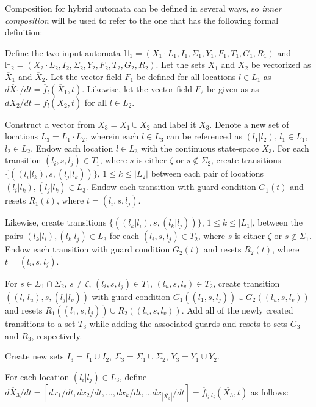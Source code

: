 Composition for hybrid automata can be defined in several ways, so \textit{inner composition} will be used to refer to the one that has the following formal definition:

Define the two input automata $\mathbb{H}_1 = (X_1 \cdot L_1, I_1, \Sigma_1, Y_1, F_1, T_1, G_1, R_1)$ and $\mathbb{H}_2 = (X_2 \cdot L_2, I_2, \Sigma_2, Y_2, F_2, T_2, G_2, R_2)$. Let the sets $X_1$ and $X_2$ be vectorized as $\overline{X}_1$ and $\overline{X}_2$. Let the vector field $F_1$ be defined for all locations $l \in L_1$ as $d\overline{X}_1 / dt = \overline{f}_{l}(\overline{X}_1, t)$. Likewise, let the vector field $F_2$ be given as as $d\overline{X}_2 / dt = \overline{f}_{l}(\overline{X}_2, t)$ for all $l \in L_2$.

Construct a vector from $X_3 = X_1 \cup X_2$ and label it $\overline{X}_{3}$. Denote a new set of locations $L_3 = L_1 \cdot L_2$, wherein each $l \in L_3$ can be referenced as $(l_1 | l_2)$, $l_1 \in L_1$, $l_2 \in L_2$.  Endow each location $l \in L_3$ with the continuous state-space $X_{3}$. For each transition $(l_i, s, l_j) \in T_1$, where $s$ is either $\zeta$ or $s \notin \Sigma_2$, create transitions $\{ ((l_i | l_k), s, (l_j | l_k)) \}$, $1 \leq k \leq |L_2|$ between each pair of locations $(l_i| l_k), (l_j |l_k)  \in L_3$. Endow each transition with guard condition $G_{1}(t)$ and resets $R_{1}(t)$, where $t = (l_i, s, l_j)$.

Likewise, create transitions $\{ ((l_k | l_i), s, (l_k | l_j)) \}$, $1 \leq k \leq |L_1|$, between the pairs $(l_k | l_i), (l_k | l_j) \in L_3$ for each $(l_i, s, l_j) \in T_2$, where $s$ is either $\zeta$ or $s \notin \Sigma_1$. Endow each transition with guard condition $G_{2}(t)$ and resets $R_{2}(t)$, where $t = (l_i, s, l_j)$.

For $s \in \Sigma_1 \cap \Sigma_2$, $s \neq \zeta$, $(l_i, s, l_j) \in T_1$, $(l_u, s, l_v) \in T_2$, create transition $((l_i | l_u), s, (l_j | l_v))$ with guard condition $G_1((l_1, s, l_j)) \cup G_2((l_u, s, l_v))$ and resets $R_1((l_1, s, l_j)) \cup R_2((l_u, s, l_v))$. Add all of the newly created transitions to a set $T_3$ while adding the associated guards and resets to sets $G_3$ and $R_3$, respectively.

Create new sets $I_3 = I_1 \cup I_2$, $\Sigma_3 = \Sigma_1 \cup \Sigma_2$, $Y_3 = Y_1 \cup Y_2$.

For each location $(l_i | l_j) \in L_3$, define $d\overline{X}_3 / dt = [dx_1 /dt, dx_2 /dt, ..., dx_k /dt ,... dx_{|\overline{X_3}| } /dt] = \overline{f}_{l_i | l_j}(\overline{X_3}, t)$ as follows:

